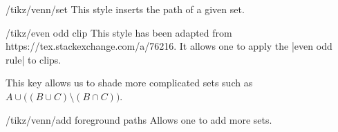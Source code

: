 \documentclass[a4paper]{ltxdoc}
\begin{document}
\begin{key}{/tikz/venn/set}
        This style inserts the path of a given set.
\end{key}


\begin{key}{/tikz/even odd clip}
        This style has been adapted from https://tex.stackexchange.com/a/76216.
		It allows one to apply the |even odd rule| to clips.
\end{key}

This key allows us to shade more complicated sets such as $A\cup\bigl((B\cup
C)\setminus (B \cap C)\bigr)$.

\begin{codeexample}[width=5cm]
\end{codeexample}

\begin{key}{/tikz/venn/add foreground paths}
        Allows one to add more sets.
\end{key}

\begin{codeexample}[width=5cm]
\end{codeexample}
\end{document}
